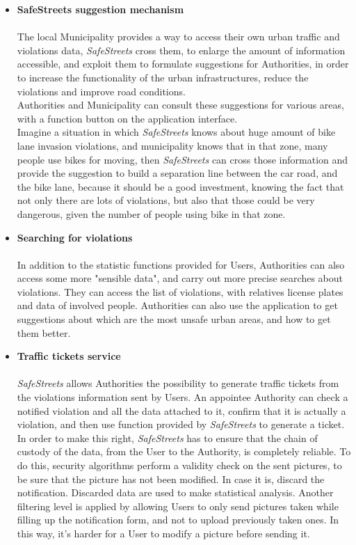     \begin{itemize}
   
    
    \item\textbf{SafeStreets suggestion mechanism}\\\\
    The local Municipality provides a way to access their own urban traffic and violations data, \textit{SafeStreets} cross them, to enlarge the amount of information accessible, and exploit them to formulate suggestions for Authorities, in order to increase the functionality of the urban infrastructures, reduce the violations and improve road conditions.\\ Authorities and Municipality can consult these suggestions for various areas, with a function button on the application interface.\\
    Imagine a situation in which \textit{SafeStreets} knows about huge amount of bike lane invasion violations, and municipality knows that in that zone, many people use bikes for moving, then \textit{SafeStreets} can cross those information and provide the suggestion to build a separation line between the car road, and the bike lane, because it should be a good investment, knowing the fact that not only there are lots of violations, but also that those could be very dangerous, given the number of people using bike in that zone. 
    
    
     
    \item\textbf{Searching for violations}\\\\
    In addition to the statistic functions provided for Users, Authorities can also access some more "sensible data", and carry out more precise searches about violations. They can access the list of violations, with relatives license plates and data of involved people.
    Authorities can also use the application to get suggestions about which are the most unsafe urban areas, and how to get them better.
    
    
    \item\textbf{Traffic tickets service}\\\\
    \textit{SafeStreets} allows Authorities the possibility to generate traffic tickets from the violations information sent by Users. An appointee Authority can check a notified violation and all the data attached to it, confirm that it is actually a violation, and then use function provided by \textit{SafeStreets} to generate a ticket. \\
    In order to make this right, \textit{SafeStreets} has to ensure that the chain of custody of the data, from the User to the Authority, is completely reliable. To do this, security algorithms perform a validity check on the sent pictures, to be sure that the picture has not been modified. In case it is, discard the notification. Discarded data are used to make statistical analysis.
    Another filtering level is applied by allowing Users to only send pictures taken while filling up the notification form, and not to upload previously taken ones. In this way, it's harder for a User to modify a picture before sending it. 
\end{itemize}

